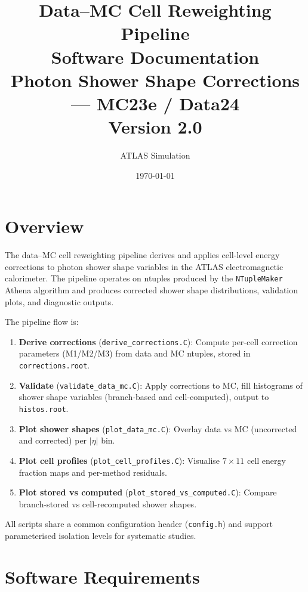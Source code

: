 \documentclass[12pt,a4paper]{article}
\title{%
  \textbf{Data--MC Cell Reweighting Pipeline}\\[6pt]
  \large Software Documentation\\[4pt]
  \large Photon Shower Shape Corrections — MC23e / Data24\\[4pt]
  \normalsize Version 2.0
}
\author{ATLAS Simulation}
\date{\today}
\begin{document}
\maketitle
\thispagestyle{fancy}

\tableofcontents
\clearpage

\section{Overview}
\label{sec:overview}

The data--MC cell reweighting pipeline derives and applies cell-level energy
corrections to photon shower shape variables in the ATLAS electromagnetic
calorimeter. The pipeline operates on ntuples produced by the
\texttt{NTupleMaker} Athena algorithm and produces corrected shower shape
distributions, validation plots, and diagnostic outputs.

The pipeline flow is:

\begin{enumerate}[leftmargin=2em]
  \item \textbf{Derive corrections} (\texttt{derive\_corrections.C}):
    Compute per-cell correction parameters (M1/M2/M3) from data and MC
    ntuples, stored in \texttt{corrections.root}.
  \item \textbf{Validate} (\texttt{validate\_data\_mc.C}):
    Apply corrections to MC, fill histograms of shower shape variables
    (branch-based and cell-computed), output to \texttt{histos.root}.
  \item \textbf{Plot shower shapes} (\texttt{plot\_data\_mc.C}):
    Overlay data vs MC (uncorrected and corrected) per $|\eta|$ bin.
  \item \textbf{Plot cell profiles} (\texttt{plot\_cell\_profiles.C}):
    Visualise $7\times11$ cell energy fraction maps and per-method residuals.
  \item \textbf{Plot stored vs computed} (\texttt{plot\_stored\_vs\_computed.C}):
    Compare branch-stored vs cell-recomputed shower shapes.
\end{enumerate}

All scripts share a common configuration header (\texttt{config.h}) and
support parameterised isolation levels for systematic studies.

\section{Software Requirements}
\label{sec:requirements}
\end{document}
